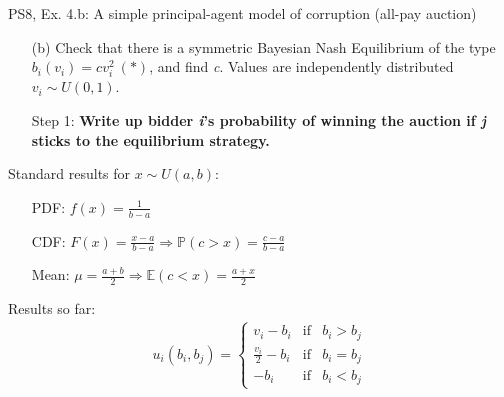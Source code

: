 \begin{frame}{PS8, Ex. 4.b: A simple principal-agent model of corruption (all-pay auction)}
    \begin{itemize}
      \item[(b)] Check that there is a symmetric Bayesian Nash Equilibrium of the type $b_i(v_i) = cv_i^2\ (*)$, and find \textit{c}. Values are independently distributed $v_i\sim U(0, 1)$.
    \end{itemize} \vspace{-8pt}
    \begin{multicols}{2}
      \begin{itemize}
        \item[Step 1:] \textbf{Write up bidder \textit{i}'s probability of winning the auction if \textit{j} sticks to the equilibrium strategy.}
      \end{itemize}
      \vfill\null\columnbreak
      Standard results for $x\sim U(a, b):$ \vspace{-6pt}
      \begin{itemize}
        \item[PDF:] $f(x)=\frac{1}{b-a}$
        \item[CDF:] $F(x)=\frac{x-a}{b-a}\Rightarrow\mathbb{P}(c>x)=\frac{c-a}{b-a}$
        \item[Mean:] $\mu=\frac{a+b}{2}\Rightarrow\mathbb{E}(c<x)=\frac{a+x}{2}$
      \end{itemize}
      \vspace{-6pt}
      Results so far: \vspace{-6pt}
      \begin{align*}
        u_i(b_i,b_j)=\left\{\begin{array}{lcl}
          v_i-b_i           & \text{if} & b_i>b_j \\
          \frac{v_i}{2}-b_i & \text{if} & b_i=b_j \\
          -b_i              & \text{if} & b_i<b_j
        \end{array}\right.
      \end{align*}
      \vfill\null
    \end{multicols}
\end{frame}
